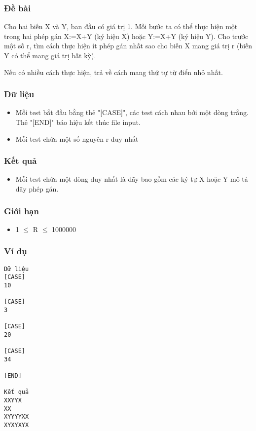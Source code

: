 



\subsubsection{   Đề bài  }

   Cho hai biến X và Y, ban đầu có giá trị 1. Mỗi bước ta có thể thực hiện một trong hai phép gán X:=X+Y (ký hiệu X) hoặc Y:=X+Y (ký hiệu Y). Cho trước một số r, tìm cách thực hiện ít phép gán nhất sao cho biến X mang giá trị r (biến Y có thể mang giá trị bất kỳ).  

   Nếu có nhiều cách thực hiện, trả về cách mang thứ tự từ điển nhỏ nhất.  

\subsubsection{   Dữ liệu  }
\begin{itemize}
	\item     Mỗi test bắt đầu bằng thẻ "[CASE]", các test cách nhau bởi một dòng trắng. Thẻ "[END]" báo hiệu kết thúc file input.   
	\item     Mỗi test chứa một số nguyên r duy nhất   
\end{itemize}

\subsubsection{   Kết quả  }
\begin{itemize}
	\item     Mỗi test chứa một dòng duy nhất là dãy bao gồm các ký tự X hoặc Y mô tả dãy phép gán.   
\end{itemize}

\subsubsection{   Giới hạn  }
\begin{itemize}
	\item     1  $\le$  R  $\le$  1000000   
\end{itemize}

\subsubsection{   Ví dụ  }
\begin{verbatim}
Dữ liệu
[CASE]
10

[CASE]
3

[CASE]
20

[CASE]
34

[END]

Kết quả
XXYYX
XX
XYYYYXX
XYXYXYX
\end{verbatim}
